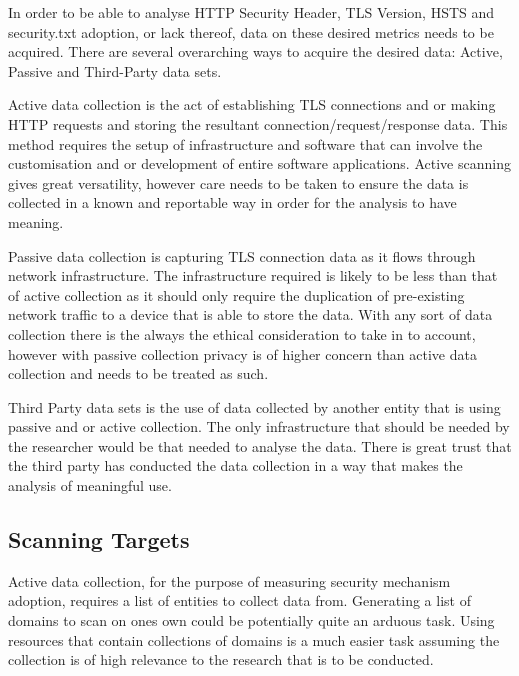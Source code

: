 \documentclass{mscreport}
\begin{document}
In order to be able to analyse HTTP Security Header, TLS Version, HSTS and security.txt adoption, or lack thereof, data on these desired metrics needs to be acquired. There are several overarching ways to acquire the desired data: Active, Passive and Third-Party data sets.

\vspace{0.3cm} \noindent
Active data collection is the act of establishing TLS connections and or making HTTP requests and storing the resultant connection/request/response data. This method requires the setup of infrastructure and software that can involve the customisation and or development of entire software applications. Active scanning gives great versatility, however care needs to be taken to ensure the data is collected in a known and reportable way in order for the analysis to have meaning.

\vspace{0.3cm} \noindent
Passive data collection is capturing TLS connection data as it flows through network infrastructure. The infrastructure required is likely to be less than that of active collection as it should only require the duplication of pre-existing network traffic to a device that is able to store the data. With any sort of data collection there is the always the ethical consideration to take in to account, however with passive collection privacy is of higher concern than active data collection and needs to be treated as such.

\vspace{0.3cm} \noindent
Third Party data sets is the use of data collected by another entity that is using passive and or active collection. The only infrastructure that should be needed by the researcher would be that needed to analyse the data. There is great trust that the third party has conducted the data collection in a way that makes the analysis of meaningful use.

\subsection{Scanning Targets}
Active data collection, for the purpose of measuring security mechanism adoption, requires a list of entities to collect data from. Generating a list of domains to scan on ones own could be potentially quite an arduous task. Using resources that contain collections of domains is a much easier task assuming the collection is of high relevance to the research that is to be conducted.
\end{document}
